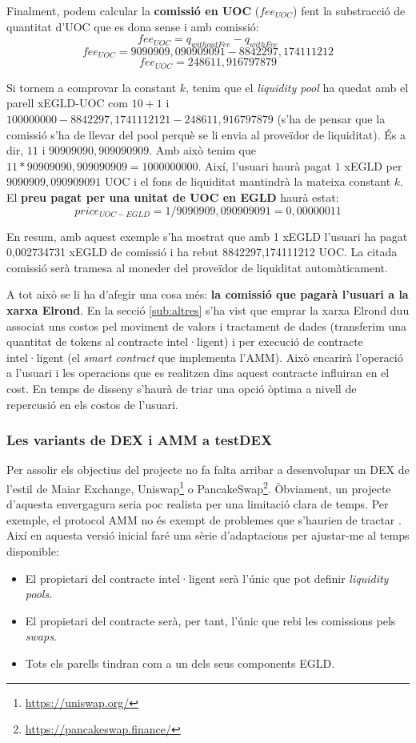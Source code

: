 \documentclass[11pt,a4paper]{article}
\begin{document}
Finalment, podem calcular la \textbf{comissió en UOC} (\(fee_{UOC}\)) fent la substracció de quantitat d'UOC que es dona sense i amb comissió:
$$ fee_{UOC} = q_{withoutFee} - q_{withFee} $$
$$ fee_{UOC} = 9090909,090909091 - 8842297,174111212 $$
$$ fee_{UOC} = 248611,916797879 $$

Si tornem a comprovar la constant \(k\), tenim que el \textit{liquidity pool} ha quedat amb el parell xEGLD-UOC com \(10 + 1 \) i \(100000000 - 8842297,1741112121 - 248611,916797879\) (s'ha de pensar que la comissió s'ha de llevar del pool perquè se li envia al proveïdor de liquiditat). És a dir, \(11\) i \(90909090,909090909\). Amb això tenim que \(11 * 90909090,909090909 = 1000000000 \). Així, l'usuari haurà pagat \(1\) xEGLD per \(9090909,090909091\) UOC i el fons de liquiditat mantindrà la mateixa constant \(k\). El \textbf{preu pagat per una unitat de UOC en EGLD} haurà estat:
$$ price_{UOC-EGLD} = 1 / 9090909,090909091 = 0,00000011 $$

En resum, amb aquest exemple s'ha mostrat que amb 1 xEGLD l'usuari ha pagat 0,002734731 xEGLD de comissió i ha rebut 8842297,174111212 UOC. La citada comissió serà tramesa al moneder del proveïdor de liquiditat automàticament.

A tot això se li ha d'afegir una cosa més: \textbf{la comissió que pagarà l'usuari a la xarxa Elrond}. En la secció \ref{sub:altres} s'ha vist que emprar la xarxa Elrond duu associat uns costos pel moviment de valors i tractament de dades (transferim una quantitat de tokens al contracte intel·ligent) i per execució de contracte intel·ligent (el \textit{smart contract} que implementa l'AMM). Això encarirà l'operació a l'usuari i les operacions que es realitzen dins aquest contracte influiran en el cost. En temps de disseny s'haurà de triar una opció òptima a nivell de repercusió en els costos de l'usuari.

\subsubsection{Les variants de DEX i AMM a testDEX}
Per assolir els objectius del projecte no fa falta arribar a desenvolupar un DEX de l'estil de Maiar Exchange, Uniswap\footnote{\url{https://uniswap.org/}} o PancakeSwap\footnote{\url{https://pancakeswap.finance/}}. Òbviament, un projecte d'aquesta envergagura seria poc realista per una limitació clara de temps. Per exemple, el protocol AMM no és exempt de problemes que s'haurien de tractar \cite{vuterin2018}. Així en aquesta versió inicial faré una sèrie d'adaptacions per ajustar-me al temps disponible:
\begin{itemize}
\item El propietari del contracte intel·ligent serà l'únic que pot definir \textit{liquidity pools}.
\item El propietari del contracte serà, per tant, l'únic que rebi les comissions pels \textit{swaps}.
\item Tots els parells tindran com a un dels seus components EGLD.
\end{itemize}
\end{document}
